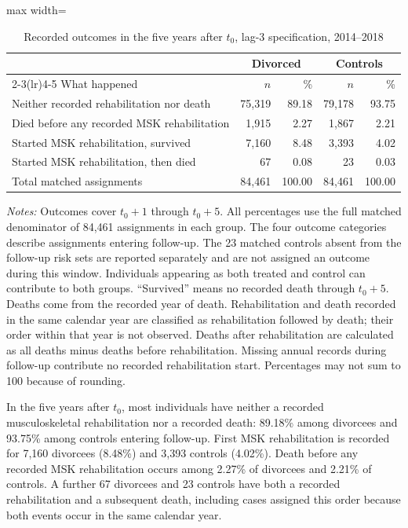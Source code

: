 \documentclass[a4paper,12pt]{article}
\theoremstyle{plain}
\theoremstyle{definition}
\theoremstyle{TheoremNum}
\theoremstyle{CorollaryNum}
\theoremstyle{PropositionNum}
\theoremstyle{TheoremNum}
\begin{document}
\begin{table}[H]
\centering
\small
\begin{adjustbox}{max width=\textwidth}
\begin{tabular}{lrrrr}
\toprule
& \multicolumn{2}{c}{Divorced} & \multicolumn{2}{c}{Controls} \\
\cmidrule(lr){2-3}\cmidrule(lr){4-5}
What happened & $n$ & \% & $n$ & \% \\
\midrule
Neither recorded rehabilitation nor death
& 75,319 & 89.18 & 79,178 & 93.75 \\
Died before any recorded MSK rehabilitation
& 1,915 & 2.27 & 1,867 & 2.21 \\
Started MSK rehabilitation, survived
& 7,160 & 8.48 & 3,393 & 4.02 \\
Started MSK rehabilitation, then died
& 67 & 0.08 & 23 & 0.03 \\
\midrule
Total matched assignments
& 84,461 & 100.00 & 84,461 & 100.00 \\
\bottomrule
\end{tabular}
\end{adjustbox}

\caption{Recorded outcomes in the five years after $t_0$, lag-3 specification, 2014--2018}
\label{tab:five_year_outcome_paths}

\par\smallskip
\begin{minipage}{\textwidth}
\footnotesize
\textit{Notes:}
Outcomes cover $t_0+1$ through $t_0+5$. All percentages use the full matched denominator of 84,461 assignments in each group. The four outcome categories describe assignments entering follow-up. The 23 matched controls absent from the follow-up risk sets are reported separately and are not assigned an outcome during this window. Individuals appearing as both treated and control can contribute to both groups. ``Survived'' means no recorded death through $t_0+5$. Deaths come from the recorded year of death. Rehabilitation and death recorded in the same calendar year are classified as rehabilitation followed by death; their order within that year is not observed. Deaths after rehabilitation are calculated as all deaths minus deaths before rehabilitation. Missing annual records during follow-up contribute no recorded rehabilitation start. Percentages may not sum to 100 because of rounding.
\end{minipage}

\end{table}

In the five years after $t_0$, most individuals have neither a recorded musculoskeletal rehabilitation nor a recorded death: 89.18\% among divorcees and 93.75\% among controls entering follow-up. First MSK rehabilitation is recorded for 7,160 divorcees (8.48\%) and 3,393 controls (4.02\%). Death before any recorded MSK rehabilitation occurs among 2.27\% of divorcees and 2.21\% of controls. A further 67 divorcees and 23 controls have both a recorded rehabilitation and a subsequent death, including cases assigned this order because both events occur in the same calendar year.
\end{document}
